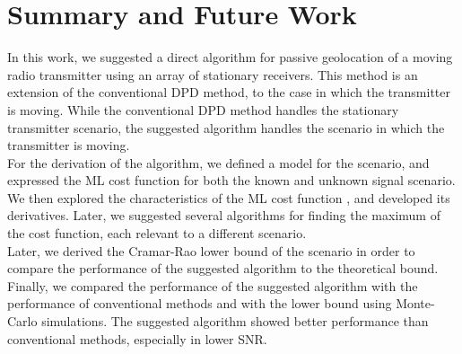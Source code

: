 

\chapter{Summary and Future Work} %
\label{Chapter7}
In this work, we suggested a direct algorithm for passive geolocation of a moving radio transmitter using an array of stationary receivers. This method is an extension of the conventional DPD method, to the case in which the transmitter is moving. While the conventional DPD method handles the stationary transmitter scenario, the suggested algorithm handles the scenario in which the transmitter is moving. \\
For the derivation of the algorithm, we defined a model for the scenario, and expressed the ML cost function for both the known and unknown signal scenario. We then explored the characteristics of the ML cost function , and developed its derivatives. Later, we suggested several algorithms for finding the maximum of the cost function, each relevant to a different scenario.\\
Later, we derived the Cramar-Rao lower bound of the scenario in order to compare the performance of the suggested algorithm to the theoretical bound.\\
Finally, we compared the performance of the suggested algorithm with the performance of conventional methods and with the lower bound using Monte-Carlo simulations. The suggested algorithm showed better performance than conventional methods, especially in lower SNR.\\

